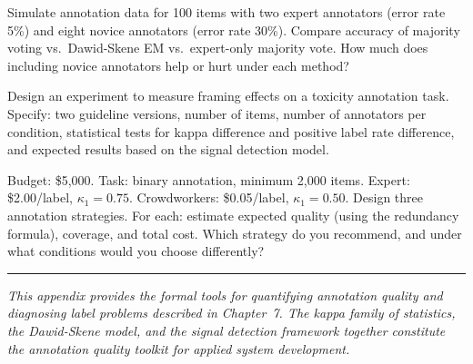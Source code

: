 \begin{Exercise}
Simulate annotation data for 100 items with two expert annotators (error rate 5\%) and eight novice annotators (error rate 30\%). Compare accuracy of majority voting vs.\ Dawid-Skene EM vs.\ expert-only majority vote. How much does including novice annotators help or hurt under each method?
\end{Exercise}

\begin{Exercise}
Design an experiment to measure framing effects on a toxicity annotation task. Specify: two guideline versions, number of items, number of annotators per condition, statistical tests for kappa difference and positive label rate difference, and expected results based on the signal detection model.
\end{Exercise}

\begin{Exercise}
Budget: \$5,000. Task: binary annotation, minimum 2,000 items. Expert: \$2.00/label, $\kappa_1 = 0.75$. Crowdworkers: \$0.05/label, $\kappa_1 = 0.50$. Design three annotation strategies. For each: estimate expected quality (using the redundancy formula), coverage, and total cost. Which strategy do you recommend, and under what conditions would you choose differently?
\end{Exercise}

\bigskip
\begin{center}
\rule{0.5\textwidth}{0.4pt}
\end{center}
\bigskip

\noindent\textit{This appendix provides the formal tools for quantifying annotation quality and diagnosing label problems described in Chapter~7. The kappa family of statistics, the Dawid-Skene model, and the signal detection framework together constitute the annotation quality toolkit for applied \hitl system development.}
\apxnumoff

